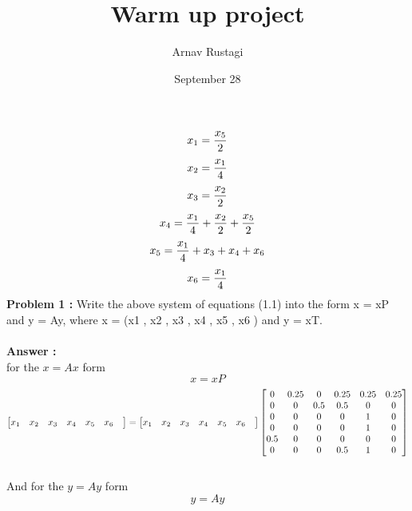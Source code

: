 \documentclass{article}
\title{Warm up project}
\author{Arnav Rustagi}
\date{September 28}
\begin{document}
\maketitle
\[ x\textsubscript{1} = \frac{x\textsubscript{5}}{2} \]
\[ x\textsubscript{2} = \frac{x\textsubscript{1}}{4} \]
\[ x\textsubscript{3} = \frac{x\textsubscript{2}}{2} \]
\[ x\textsubscript{4} = \frac{x\textsubscript{1}}{4} + \frac{x\textsubscript{2}}{2} + \frac{x\textsubscript{5}}{2}\]
\[ x\textsubscript{5} = \frac{x\textsubscript{1}}{4} + x\textsubscript{3} + x\textsubscript{4} + x\textsubscript{6}\]
\[ x\textsubscript{6} = \frac{x\textsubscript{1}}{4} \]
\textbf{Problem 1 :} Write the above system of equations (1.1) into the form x = xP and y = Ay, where x = (x1 , x2 , x3 , x4 , x5 , x6 ) and y = xT.
\\\\\textbf{Answer :}
\\for the \(x = Ax\) form
\[x = xP\]
$$
\begin{bmatrix}
	x\textsubscript{1}&
	x\textsubscript{2}&
	x\textsubscript{3}&
	x\textsubscript{4}&
	x\textsubscript{5}&
	x\textsubscript{6}&
\end{bmatrix}= 
\begin{bmatrix}
	x\textsubscript{1} &
	x\textsubscript{2} &
	x\textsubscript{3} &
	x\textsubscript{4} &
	x\textsubscript{5} &
	x\textsubscript{6} &
\end{bmatrix}
\begin{bmatrix} 
	0 & 0.25 & 0   & 0.25 & 0.25 & 0.25 \\
	0   & 0  & 0.5 & 0.5  & 0   & 0\\
	0   & 0  & 0   & 0    & 1   & 0 \\
	0   & 0  & 0   & 0    & 1   & 0 \\
	0.5 & 0  & 0   & 0    & 0   & 0 \\
	0   & 0  & 0   & 0.5    & 1   & 0 \\
\end{bmatrix}
$$\\
And for the \(y = Ay\) form
\[y = Ay\]
\end{document}
